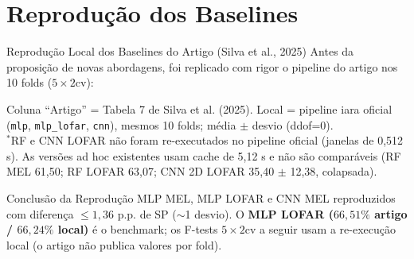 \documentclass[aspectratio=169]{beamer}
\begin{document}
\section{Reprodu\c{c}\~{a}o dos Baselines}

\begin{frame}{Reprodu\c{c}\~{a}o Local dos Baselines do Artigo (Silva et al., 2025)}
    \small
    Antes da proposi\c{c}\~{a}o de novas abordagens, foi replicado com rigor o pipeline do artigo nos 10 folds ($5\times2$cv):
    
    \begin{table}[h]
    \centering
    \end{table}
    \vspace{-0.2cm}
    {\tiny Coluna ``Artigo'' = Tabela 7 de Silva et al. (2025). Local = pipeline iara oficial (\texttt{mlp}, \texttt{mlp\_lofar}, \texttt{cnn}), mesmos 10 folds; m\'{e}dia $\pm$ desvio (ddof=0).\\
    $^{*}$RF e CNN LOFAR n\~{a}o foram re-executados no pipeline oficial (janelas de 0,512 s). As vers\~{o}es ad hoc existentes usam cache de 5,12 s e n\~{a}o s\~{a}o compar\'{a}veis (RF MEL 61,50; RF LOFAR 63,07; CNN 2D LOFAR 35,40 $\pm$ 12,38, colapsada).\par}

    \vspace{0.05cm}
    \begin{alertblock}{Conclus\~{a}o da Reprodu\c{c}\~{a}o}
        \footnotesize
        MLP MEL, MLP LOFAR e CNN MEL reproduzidos com diferen\c{c}a $\le 1,36$ p.p. de SP ($\sim$1 desvio). O \textbf{MLP LOFAR ($66,51\%$ artigo / $66,24\%$ local)} \'{e} o benchmark; os F-tests $5\times2$cv a seguir usam a re-execu\c{c}\~{a}o local (o artigo n\~{a}o publica valores por fold).
    \end{alertblock}
\end{frame}
\end{document}
